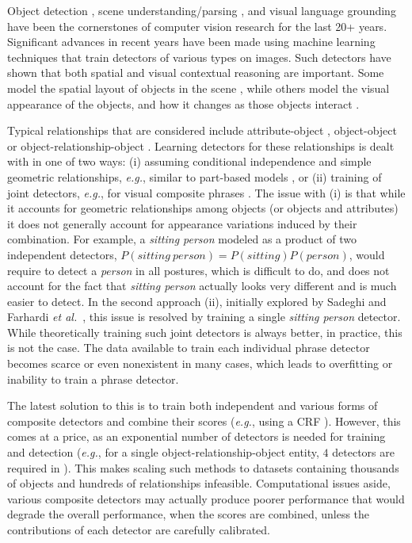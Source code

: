 \documentclass[runningheads]{llncs}
\makeatletter
\newcommand*{\eg}{{\em e.g.}\@\xspace}
\newcommand*{\etal}{{\em et al.}\@\xspace}
\makeatother
\begin{document}
Object detection \cite{Dalal2005,Felzenszwalb2010,Girshick2014,Lan2013}, scene understanding/parsing \cite{Chai2013,Johnson2015,Li2012,Yao2012}, and visual language grounding \cite{Johnson2015,Siskind1995} have been the cornerstones of computer vision research for the last 20+ years. Significant advances in recent years have been made using machine learning techniques that train detectors of various types on images. Such detectors have shown that both spatial and visual contextual reasoning are important. Some model the spatial layout of objects in the scene  \cite{Chai2013,Gupta2008,Johnson2015,Hoiem2006,Li2012}, while others model the visual appearance of the objects, and how it changes as those objects interact  \cite{Izadinia2014,Lan2013,Sadeghi2011,Sadeghi2015}. 

Typical relationships that are considered include attribute-object \cite{Johnson2015}, object-object \cite{Lan2013} or object-relationship-object \cite{Johnson2015,Sadeghi2011,Sadeghi2015}. Learning detectors for these relationships is dealt with in one of two ways: (i) assuming conditional independence and simple geometric relationships, \eg, similar to part-based models \cite{Johnson2015}, or (ii) training of joint detectors, \eg, for visual composite phrases \cite{Sadeghi2011,Sadeghi2015}. The issue with (i) is that while it accounts for geometric relationships among objects (or objects and attributes) it does not generally account for appearance variations induced by their combination. For example, a {\em sitting person} modeled as a product of two independent detectors, $P(sitting~person) = P(sitting)P(person)$, would require to detect a {\em person} in all postures, which is difficult to do, and does not account for the fact that {\em sitting person} actually looks very different and is much easier to detect. 
In the second approach (ii), initially explored by Sadeghi and Farhardi \etal~\cite{Sadeghi2011}, this issue is resolved by training a single {\em sitting person} detector. While theoretically training such joint detectors is always better, in practice, this is not the case. The data available to train each individual phrase detector becomes scarce or even nonexistent in many cases, which leads to overfitting or inability to train a phrase detector.

The latest solution to this is to train both independent and various forms of composite detectors and combine their scores (\eg, using a CRF \cite{Sadeghi2015}). However, this comes at a price, as an exponential number of detectors is needed for training and detection (\eg, for a single object-relationship-object entity, $4$ detectors are required in \cite{Sadeghi2015}). This makes scaling such methods to datasets containing thousands of objects and hundreds of relationships infeasible. Computational issues aside, various composite detectors may actually produce poorer performance that would degrade the overall performance, when the scores are combined, unless the contributions of each detector are carefully calibrated.
\end{document}
